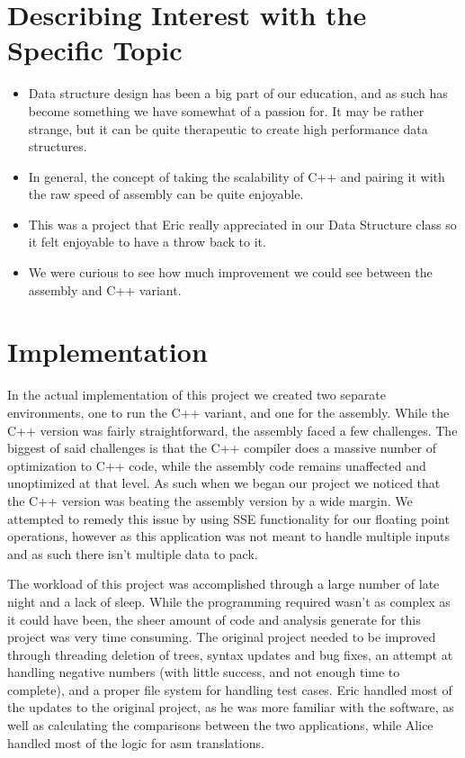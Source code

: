 \documentclass[a4paper,10pt]{article}
\begin{document}
\section*{Describing Interest with the Specific Topic}
\begin{itemize}
  \item Data structure design has been a big part of our education, and as such has become something we have somewhat of a passion for. It may be rather strange, but it can be quite therapeutic to create high performance data structures.
  \item In general, the concept of taking the scalability of C++ and pairing it with the raw speed of assembly can be quite enjoyable.
  \item This was a project that Eric really appreciated in our Data Structure class so it felt enjoyable to have a throw back to it.
  \item We were curious to see how much improvement we could see between the assembly and C++ variant.
\end{itemize} 

\section*{Implementation}
\smallskip 
In the actual implementation of this project we created two separate environments, one to run the C++ variant, and one for the assembly. While the C++ version was fairly straightforward, the assembly faced a few challenges. The biggest of said challenges is that the C++ compiler does a massive number of optimization to C++ code, while the assembly code remains unaffected and unoptimized at that level. As such when we began our project we noticed that the C++ version was beating the assembly version by a wide margin. We attempted to remedy this issue by using SSE functionality for our floating point operations, however as this application was not meant to handle multiple inputs and as such there isn't multiple data to pack.

\smallskip
The workload of this project was accomplished through a large number of late night and a lack of sleep. While the programming required wasn't as complex as it could have been, the sheer amount of code and analysis generate for this project was very time consuming. The original project needed to be improved through threading deletion of trees, syntax updates and bug fixes, an attempt at handling negative numbers (with little success, and not enough time to complete), and a proper file system for handling test cases. Eric handled most of the updates to the original project, as he was more familiar with the software, as well as calculating the comparisons between the two applications, while Alice handled most of the logic for asm translations. 
\end{document}
